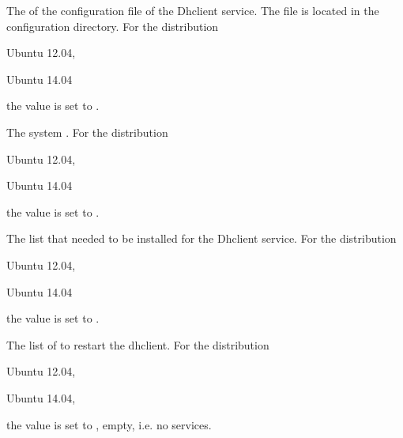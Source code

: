 
The  of the configuration file of the Dhclient service. 
The file is located in the configuration directory.
For the distribution
\begin{inparaitem}
\item[\TheDistribution{ubuntu}] Ubuntu 12.04,
\item[\TheDistribution{ubuntu}] Ubuntu 14.04
\end{inparaitem}
the value is set to .


The system . 
For the distribution
\begin{inparaitem}
\item[\TheDistribution{ubuntu}] Ubuntu 12.04,
\item[\TheDistribution{ubuntu}] Ubuntu 14.04
\end{inparaitem}
the value is set to .


The  list that needed to be installed for the Dhclient service.
For the distribution
\begin{inparaitem}
\item[\TheDistribution{ubuntu}] Ubuntu 12.04,
\item[\TheDistribution{ubuntu}] Ubuntu 14.04
\end{inparaitem}
the value is set to .


The list of  to restart the dhclient.
For the distribution
\begin{inparaitem}
\item[\TheDistribution{ubuntu}] Ubuntu 12.04,
\item[\TheDistribution{ubuntu}] Ubuntu 14.04,
\end{inparaitem}
the value is set to \qcode{}, empty, i.e. no services.

